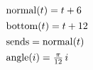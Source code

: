 \documentclass[12pt]{article}
\begin{document}
\[\begin{array}{@{}l@{}}
  \mathrm{normal}(t) = t+6 \\[4pt]
  \mathrm{bottom}(t) = t+12 \\[4pt]
  \mathrm{sends} = \mathrm{normal}(t) \\[4pt]
  \mathrm{angle}(i) = \tfrac{\pi}{12}\, i
\end{array}\]
\end{document}

